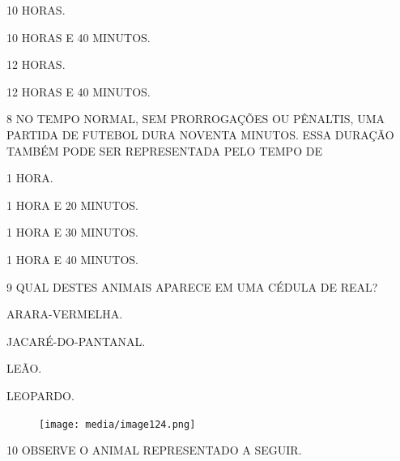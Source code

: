 \begin{escolha}%
\item 10 HORAS.

\item 10 HORAS E 40 MINUTOS.

\item 12 HORAS.

\item 12 HORAS E 40 MINUTOS.
\end{escolha}

\num{8} NO TEMPO NORMAL, SEM PRORROGAÇÕES OU PÊNALTIS, UMA PARTIDA DE FUTEBOL DURA NOVENTA MINUTOS. ESSA DURAÇÃO TAMBÉM PODE SER
REPRESENTADA PELO TEMPO DE

\begin{escolha}%
\item 1 HORA.

\item 1 HORA E 20 MINUTOS.

\item 1 HORA E 30 MINUTOS.

\item 1 HORA E 40 MINUTOS.
\end{escolha}

\pagebreak

\num{9} QUAL DESTES ANIMAIS APARECE EM UMA CÉDULA DE REAL?

\begin{multicols}{2}
\begin{escolha}[itemsep=0pt]
\item ARARA-VERMELHA.

\item JACARÉ-DO-PANTANAL.

\item LEÃO.

\item LEOPARDO.
\end{escolha}
\end{multicols}

\begin{figure}[H]
\centering
\texttt{[image: media/image124.png]}
\end{figure}

\num{10} OBSERVE O ANIMAL REPRESENTADO A SEGUIR.\bigskip

